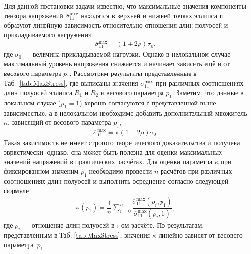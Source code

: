 Для данной постановки задачи известно, что максимальные значения компоненты тензора напряжений $\overline{\sigma}_{11}^{\max}$ находятся в верхней и нижней точках эллипса и образуют линейную зависимость относительно отношения длин полуосей и прикладываемого нагружения \cite{Birger, Bezuh}
\begin{gather*}
	\overline{\sigma}_{11}^{\max} = \left( 1 + 2 \rho \right) \sigma_0,
\end{gather*}
где $\sigma_0$ --- величина прикладываемой нагрузки. Однако в нелокальном случае максимальный уровень напряжения снижается и начинает зависеть ещё и от весового параметра $p_1$. Рассмотрим результаты представленные в \mbox{Таб. \ref{tab:MaxStress}}, где выписаны значения $\overline{\sigma}_{11}^{\max}$ при различных соотношениях длин полуосей эллипса $R_1$ и $R_2$ и весового параметра $p_1$. Заметим, что данные в локальном случае ($p_1 = 1$) хорошо согласуются с представленной выше зависимостью, а в нелокальном необходимо добавить дополнительный множитель $\kappa$, зависящий от весового параметра $p_1$,
\begin{gather*}
	\overline{\sigma}_{11}^{\max} = \kappa \left( 1 + 2 \rho \right) \sigma_0.
\end{gather*}
Такая зависимость не имеет строгого теоретического доказательства и получена эвристически, однако, она может быть полезна для оценки максимальных значений напряжений в практических расчётах. Для оценки параметра $\kappa$ при фиксированном значеним $p_1$ необходимо провести $n$ расчётов при различных соотношениях длин полуосей и выполнить осреднение согласно следующей формуле
\begin{gather}
	\label{eq:Averaging}
	\kappa (p_1) = \dfrac{1}{n} \sum\limits_{i = 0}^{n} \dfrac{\overline{\sigma}_{11}^{\max} (\rho_i, p_1)}{\overline{\sigma}_{11}^{\max} (\rho_i, 1)},
\end{gather}
где $\rho_i$ --- отношение длин полуосей в $i$-ом расчёте. По результатам, представленным в Таб. \ref{tab:MaxStress}, значения $\kappa$ линейно зависят от весового параметра~$p_1$.

